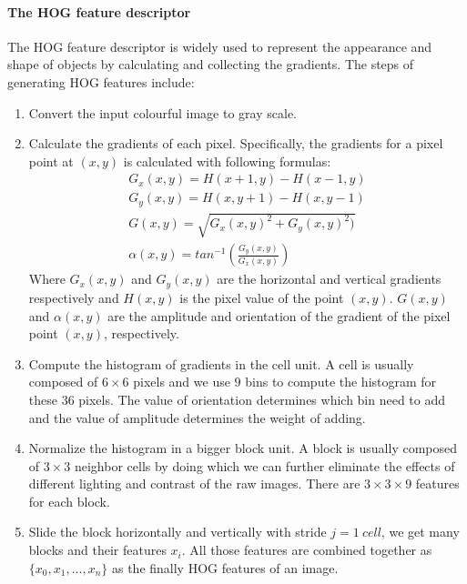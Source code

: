 \paragraph*{The HOG feature descriptor}
The HOG feature descriptor is widely used to represent the appearance and shape of objects by calculating and collecting the gradients. The steps of generating HOG features include:
\begin{enumerate}
	\item Convert the input colourful image to gray scale.
	\item Calculate the gradients of each pixel. Specifically, the gradients for a pixel point at \((x,y)\) is calculated with following formulas:
	\begin{eqnarray}
		G_x(x,y) = H(x+1,y) - H(x-1,y) \\
		G_y(x,y) = H(x,y+1) - H(x,y-1) \\
		G(x,y) = \sqrt{G_x(x,y)^2 + G_y(x,y)^2)} \\
		\alpha(x,y) = tan^{-1}(\frac{G_y(x,y)}{G_x(x,y)})
	\end{eqnarray}
	Where \(G_x(x,y)\) and \(G_y(x,y)\) are the horizontal and vertical gradients respectively and \(H(x,y)\) is the pixel value of the point \((x,y)\). \(G(x,y)\) and \(\alpha(x,y)\) are the amplitude and orientation of the gradient of the pixel point \((x,y)\), respectively.
	
	\item Compute the histogram of gradients in the cell unit. A cell is usually composed of \(6 \times 6\) pixels and we use \(9\) bins to compute the histogram for these \(36\) pixels. The value of orientation determines which bin need to add and the value of amplitude determines the weight of adding.
	
	\item Normalize the histogram in a bigger block unit. A block is usually composed of \(3 \times 3 \)  neighbor cells by doing which we can further eliminate the effects of different lighting and contrast of the raw images.  There are \(3 \times 3 \times 9 \) features for each block.
	
	\item Slide the block horizontally and vertically with stride \(j=1\ cell\), we get many blocks and their features \(x_i\). All those features are combined together as \(\{x_0, x_1,...,x_n\}\) as the finally HOG features of an image.
\end{enumerate}

